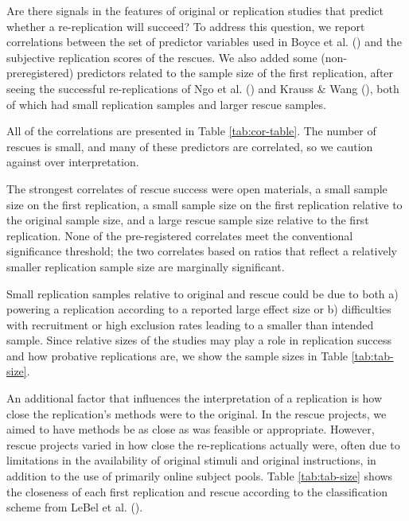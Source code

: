 \documentclass[
  english,
  a4paper,
]{article}
\begin{document}
Are there signals in the features of original or replication studies that predict whether a re-replication will succeed?
To address this question, we report correlations between the set of predictor variables used in Boyce et al. () and the subjective replication scores of the rescues.
We also added some (non-preregistered) predictors related to the sample size of the first replication, after seeing the successful re-replications of Ngo et al. () and Krauss \& Wang (), both of which had small replication samples and larger rescue samples.

All of the correlations are presented in Table \ref{tab:cor-table}.
The number of rescues is small, and many of these predictors are correlated, so we caution against over interpretation.

The strongest correlates of rescue success were open materials, a small sample size on the first replication, a small sample size on the first replication relative to the original sample size, and a large rescue sample size relative to the first replication.
None of the pre-registered correlates meet the conventional significance threshold; the two correlates based on ratios that reflect a relatively smaller replication sample size are marginally significant.

Small replication samples relative to original and rescue could be due to both a) powering a replication according to a reported large effect size or b) difficulties with recruitment or high exclusion rates leading to a smaller than intended sample.
Since relative sizes of the studies may play a role in replication success and how probative replications are, we show the sample sizes in Table \ref{tab:tab-size}.

An additional factor that influences the interpretation of a replication is how close the replication's methods were to the original.
In the rescue projects, we aimed to have methods be as close as was feasible or appropriate.
However, rescue projects varied in how close the re-replications actually were, often due to limitations in the availability of original stimuli and original instructions, in addition to the use of primarily online subject pools.
Table \ref{tab:tab-size} shows the closeness of each first replication and rescue according to the classification scheme from LeBel et al. ().
\end{document}
